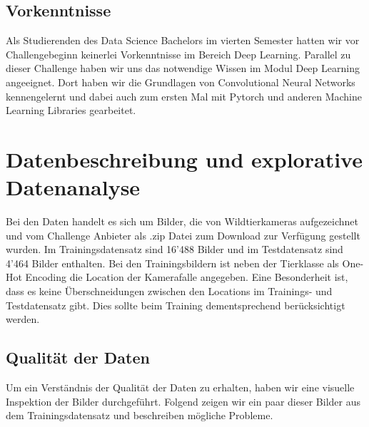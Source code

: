 \documentclass{article}
\begin{document}
\subsection{Vorkenntnisse}
Als Studierenden des Data Science Bachelors im vierten Semester hatten wir vor Challengebeginn keinerlei Vorkenntnisse im Bereich Deep Learning. Parallel zu dieser Challenge haben wir uns das notwendige Wissen im Modul Deep Learning angeeignet. Dort haben wir die Grundlagen von Convolutional Neural Networks kennengelernt und dabei auch zum ersten Mal mit Pytorch und anderen Machine Learning Libraries gearbeitet.

\newpage

\section{Datenbeschreibung und explorative Datenanalyse}

Bei den Daten handelt es sich um Bilder, die von Wildtierkameras aufgezeichnet und vom Challenge Anbieter als .zip Datei zum Download zur Verfügung gestellt wurden. Im Trainingsdatensatz sind 16'488 Bilder und im Testdatensatz sind 4'464 Bilder enthalten. Bei den Trainingsbildern ist neben der Tierklasse als One-Hot Encoding die Location der Kamerafalle angegeben. Eine Besonderheit ist, dass es keine Überschneidungen zwischen den Locations im Trainings- und Testdatensatz gibt. Dies sollte beim Training dementsprechend berücksichtigt werden.

\subsection{Qualität der Daten}
Um ein Verständnis der Qualität der Daten zu erhalten, haben wir eine visuelle Inspektion der Bilder durchgeführt. Folgend zeigen wir ein paar dieser Bilder aus dem Trainingsdatensatz und beschreiben mögliche Probleme.
\end{document}
